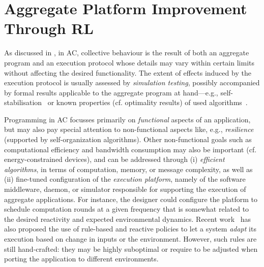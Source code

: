 \section{Aggregate Platform Improvement Through \acl{RL}}\label{acsos2022:sec:contribution}


As discussed in ,
 in \ac{AC}, collective behaviour 
 is the result of both
 an aggregate program
 and an execution protocol
 whose details may vary within certain limits
 without affecting the desired functionality.
%
The extent of effects induced by the execution protocol
 is usually assessed by \emph{simulation testing},
 possibly accompanied by formal results applicable to the aggregate program at hand---e.g., self-stabilisation~\cite{DBLP:journals/tomacs/ViroliABDP18}
  or known properties (cf. optimality results) of used algorithms~\cite{DBLP:conf/saso/AudritoCDV17,DBLP:journals/cee/AudritoCDPV21}.

Programming in \ac{AC}
 focusses primarily on \emph{functional} aspects of an application,
 but may also pay special attention to non-functional aspects like, e.g., \emph{resilience} (supported by self-organization algorithms).
%
Other non-functional goals such as computational efficiency and bandwidth consumption may also be important (cf. energy-constrained devices), 
 and can be addressed through (i) \emph{efficient algorithms}, in terms of computation, memory, or message complexity,
 as well as 
 (ii) fine-tuned configuration of the \emph{execution platform}, namely of the software middleware, daemon, or simulator responsible for supporting the execution of aggregate applications. 
%
%
%
For instance, the designer could configure the platform 
 to schedule computation rounds 
 at a given frequency
 that is somewhat related to the desired reactivity
 and expected environmental dynamics.
%
Recent work~\cite{danilo2021lmcs} has also proposed the use of rule-based and reactive policies to let a system \emph{adapt} its execution based on change in inputs or the environment.
%
However, such rules are still hand-crafted: they may be highly suboptimal or require to be adjusted when porting the application to different environments.
%

